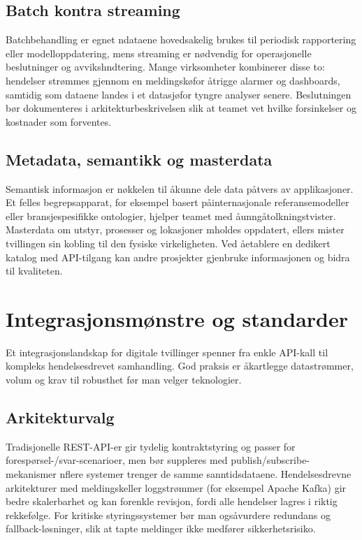 \subsection{Batch kontra streaming}
Batchbehandling er egnet n\aar dataene hovedsakelig brukes til periodisk rapportering eller modelloppdatering, mens streaming er n\o dvendig for operasjonelle beslutninger og avviksh\a ndtering. Mange virksomheter kombinerer disse to: hendelser str\o mmes gjennom en meldingsk\o for \aa trigge alarmer og dashboards, samtidig som dataene landes i et datasj\o for tyngre analyser senere. Beslutningen b\o r dokumenteres i arkitekturbeskrivelsen slik at teamet vet hvilke forsinkelser og kostnader som forventes.

\subsection{Metadata, semantikk og masterdata}
Semantisk informasjon er n\o kkelen til \aa kunne dele data p\aa tvers av applikasjoner. Et felles begrepsapparat, for eksempel basert p\aa internasjonale referansemodeller eller bransjespesifikke ontologier, hjelper teamet med \aa unng\aa tolkningstvister. Masterdata om utstyr, prosesser og lokasjoner m\a holdes oppdatert, ellers mister tvillingen sin kobling til den fysiske virkeligheten. Ved \aa etablere en dedikert katalog med API-tilgang kan andre prosjekter gjenbruke informasjonen og bidra til kvaliteten.

\section{Integrasjonsm\o nstre og standarder}
Et integrasjonslandskap for digitale tvillinger spenner fra enkle API-kall til kompleks hendelsesdrevet samhandling. God praksis er \aa kartlegge datastr\o mmer, volum og krav til robusthet f\o r man velger teknologier.

\subsection{Arkitekturvalg}
Tradisjonelle REST-API-er gir tydelig kontraktstyring og passer for foresp\o rsel-/svar-scenarioer, men b\o r suppleres med publish/subscribe-mekanismer n\aar flere systemer trenger de samme sanntidsdataene. Hendelsesdrevne arkitekturer med meldingsk\oer eller loggstr\o mmer (for eksempel Apache Kafka) gir bedre skalerbarhet og kan forenkle revisjon, fordi alle hendelser lagres i riktig rekkef\o lge. For kritiske styringssystemer b\o r man ogs\aa vurdere redundans og fallback-l\o sninger, slik at tapte meldinger ikke medf\o rer sikkerhetsrisiko.

